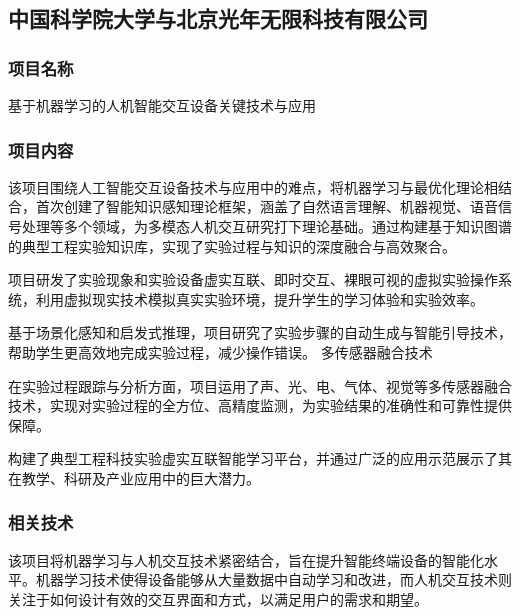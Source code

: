 \large
\subsection{中国科学院大学与北京光年无限科技有限公司}\label{中国科学院大学与北京光年无限科技有限公司}

\subsubsection{项目名称}

基于机器学习的人机智能交互设备关键技术与应用

\subsubsection{项目内容}


该项目围绕人工智能交互设备技术与应用中的难点，将机器学习与最优化理论相结合，首次创建了智能知识感知理论框架，涵盖了自然语言理解、机器视觉、语音信号处理等多个领域，为多模态人机交互研究打下理论基础。通过构建基于知识图谱的典型工程实验知识库，实现了实验过程与知识的深度融合与高效聚合。


项目研发了实验现象和实验设备虚实互联、即时交互、裸眼可视的虚拟实验操作系统，利用虚拟现实技术模拟真实实验环境，提升学生的学习体验和实验效率。


基于场景化感知和启发式推理，项目研究了实验步骤的自动生成与智能引导技术，帮助学生更高效地完成实验过程，减少操作错误。
多传感器融合技术

在实验过程跟踪与分析方面，项目运用了声、光、电、气体、视觉等多传感器融合技术，实现对实验过程的全方位、高精度监测，为实验结果的准确性和可靠性提供保障。


构建了典型工程科技实验虚实互联智能学习平台，并通过广泛的应用示范展示了其在教学、科研及产业应用中的巨大潜力。

\subsubsection{相关技术}



该项目将机器学习与人机交互技术紧密结合，旨在提升智能终端设备的智能化水平。机器学习技术使得设备能够从大量数据中自动学习和改进，而人机交互技术则关注于如何设计有效的交互界面和方式，以满足用户的需求和期望。

